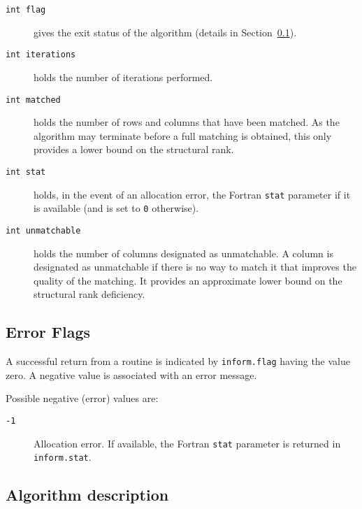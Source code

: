\begin{description}

\item[\texttt{int flag}] gives the exit status of the algorithm (details in Section~\ref{returns:auction}).

\item[\texttt{int iterations}] holds the number of iterations performed.

\item[\texttt{int matched}] holds the number of rows and columns that have been matched. As the algorithm may terminate before a full matching is obtained, this only provides a lower bound on the structural rank.

\item[\texttt{int stat}] holds, in the event of an allocation error, the Fortran \texttt{stat} parameter if it is available (and is set to \texttt{0} otherwise).

\item[\texttt{int unmatchable}] holds the number of columns designated as unmatchable. A column is designated as unmatchable if there is no way to match it that improves the quality of the matching. It provides an approximate lower bound on the structural rank deficiency.

\end{description}

\subsection{Error Flags} \label{returns:auction}
A successful return from a routine is indicated by \texttt{inform.flag} having the value zero. A negative value is associated with an error message.

Possible negative (error) values are:
\begin{description}
\item[\texttt{-1}] Allocation error. If available, the Fortran \texttt{stat} parameter is returned in \texttt{inform.stat}.
\end{description}

\subsection{Algorithm description} \label{method:auction}

